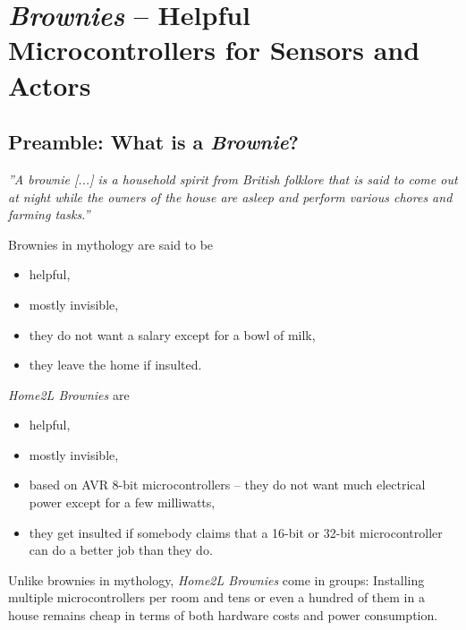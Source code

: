 \documentclass[12pt,english,parskip=half,headheight=19pt]{scrreprt}
\begin{document}
%
\chapter{\textit{Brownies} -- Helpful Microcontrollers for Sensors and Actors}
\label{ch:brownies}
%



\section{Preamble: What is a \textit{Brownie}?}
\label{sec:brownies-preamble}


\textit{''A brownie [...] is a household spirit from British folklore that is said to come out at night while the owners of the house are asleep and perform various chores and farming tasks.''} \break
[\href{https://en.wikipedia.org/w/index.php?title=Brownie_(folklore)&oldid=929557103}{Wikipedia: Brownie (folklore)}]


Brownies in mythology are said to be
\begin{itemize}
  \item helpful,
  \item mostly invisible,
  \item they do not want a salary except for a bowl of milk,
  \item they leave the home if insulted.
\end{itemize}



\textit{Home2L Brownies} are
\begin{itemize}
  \item helpful,
  \item mostly invisible,
  \item based on AVR 8-bit microcontrollers -- they do not want much electrical power except for a few milliwatts,
  \item they get insulted if somebody claims that a 16-bit or 32-bit microcontroller can do
        a better job than they do.
\end{itemize}
Unlike brownies in mythology, \textit{Home2L Brownies} come in groups:
Installing multiple microcontrollers per room and tens or even a hundred of them in a house remains cheap in terms of both hardware costs and power consumption.
\end{document}
